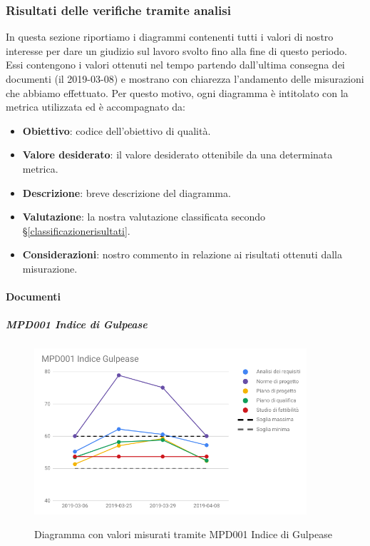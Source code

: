 	\subsubsection{Risultati delle verifiche tramite analisi}
	In questa sezione riportiamo i diagrammi contenenti tutti i valori di nostro interesse per dare un giudizio sul lavoro svolto fino alla fine di questo periodo.
	Essi contengono i valori ottenuti nel tempo partendo dall'ultima consegna dei documenti (il 2019-03-08) e mostrano con chiarezza l'andamento delle misurazioni che abbiamo effettuato.
	Per questo motivo, ogni diagramma è intitolato con la metrica utilizzata ed è accompagnato da:
	\begin{itemize}
		\item \textbf{Obiettivo}: codice dell'obiettivo di qualità.
		\item \textbf{Valore desiderato}: il valore desiderato ottenibile da una determinata metrica.
		\item \textbf{Descrizione}: breve descrizione del diagramma.
		\item \textbf{Valutazione}: la nostra valutazione classificata secondo \S\ref{classificazionerisultati}.
		\item \textbf{Considerazioni}: nostro commento in relazione ai risultati ottenuti dalla misurazione.
	\end{itemize}

	\paragraph{Documenti}

		\subparagraph{MPD001 Indice di Gulpease}

		\begin{figure}[H]
			\centering
			\includegraphics[width=0.9\textwidth]{img/cruscotti/RQ/MPD001.png}
			\label{immaginegulpeaseRQ}
			\caption{Diagramma con valori misurati tramite MPD001 Indice di Gulpease}
		\end{figure}

